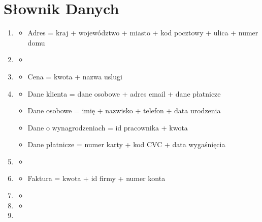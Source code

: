 \documentclass[a4paper,11pt]{article}
\begin{document}
\section{Słownik Danych}
\begin{enumerate}[label= \textbf{\Alph*}]
\item \begin{itemize} %
    \item[]
    Adres = kraj + województwo + miasto + kod pocztowy + ulica + numer domu
\end{itemize}
\item \begin{itemize} %
    \item[]
\end{itemize}
\item \begin{itemize} %
    \item[]
    Cena = kwota + nazwa uslugi
\end{itemize}
\item \begin{itemize} %
    \item[]
    Dane klienta = dane osobowe + adres email + dane płatnicze
    \item[]
    Dane osobowe = imię + nazwisko + telefon + data urodzenia
    \item[]
    Dane o wynagrodzeniach = id pracownika + kwota
    \item[]
    Dane płatnicze = numer karty + kod CVC + data wygaśnięcia
\end{itemize}
\item \begin{itemize} %
    \item[]
\end{itemize}
\item \begin{itemize} %
    \item[]
    Faktura = kwota + id firmy + numer konta
\end{itemize}
\item \begin{itemize} %
    \item[]
\end{itemize}
\item \begin{itemize} %
    \item[]
\end{itemize}
\item \begin{itemize} %

\end{itemize}
\end{enumerate}
\end{document}

